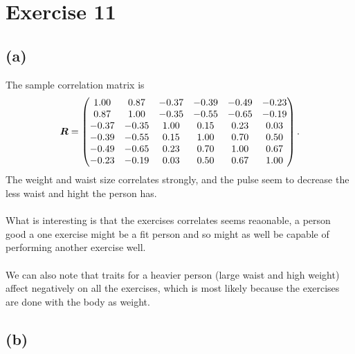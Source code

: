 
\section*{Exercise 11}
\label{sec:exericse-11}

\subsection*{(a)}
\label{sec:a-7}

The sample correlation matrix is
\begin{equation*}
  \bm{R} =
  \begin{pmatrix}
    1.00 &0.87 &-0.37 &-0.39 &-0.49 &-0.23 \\ 
    0.87 &1.00 &-0.35 &-0.55 &-0.65 &-0.19 \\ 
    -0.37 &-0.35 &1.00 &0.15 &0.23 &0.03 \\ 
    -0.39 &-0.55 &0.15 &1.00 &0.70 &0.50 \\ 
    -0.49 &-0.65 &0.23 &0.70 &1.00 &0.67 \\ 
    -0.23 &-0.19 &0.03 &0.50 &0.67 &1.00  
  \end{pmatrix}.
\end{equation*}
The weight and waist size correlates strongly, and the pulse seem to
decrease the less waist and hight the person has. \\
\\
What is interesting is that the exercises correlates seems reaonable,  a person good a one exercise might be a fit person and so might as well be capable of performing another exercise well. \\
\\
We can also note that traits for a heavier person (large waist and high
weight) affect negatively on all the exercises, which is most likely
because the exercises are done with the body as weight.

\subsection*{(b)}
\label{sec:b-10}

